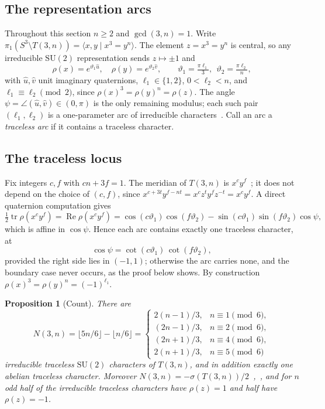 \documentclass[11pt,reqno]{amsart}
\theoremstyle{plain}
\newtheorem{proposition}[theorem]{Proposition}
\theoremstyle{definition}
\newcommand{\SU}{\mathrm{SU}(2)}
\newcommand{\tr}{\operatorname{tr}}
\begin{document}
\subsection{The representation arcs}
Throughout this section $n\ge2$ and $\gcd(3,n)=1$. Write
$\pi_1(S^3\setminus T(3,n))=\langle x,y\mid x^3=y^n\rangle$. The element
$z=x^3=y^n$ is central, so any irreducible $\SU$ representation sends $z\mapsto\pm1$ and
\[
\rho(x)=e^{\vartheta_1\hat u},\quad\rho(y)=e^{\vartheta_2\hat v},\qquad
\vartheta_1=\tfrac{\pi\ell_1}{3},\ \ \vartheta_2=\tfrac{\pi\ell_2}{n},
\]
with $\hat u,\hat v$ unit imaginary quaternions, $\ell_1\in\{1,2\}$, $0<\ell_2<n$, and
$\ell_1\equiv\ell_2\pmod2$, since $\rho(x)^3=\rho(y)^n=\rho(z)$. The angle $\psi=\angle(\hat u,\hat
v)\in(0,\pi)$ is the only remaining modulus; each such pair $(\ell_1,\ell_2)$ is a one-parameter arc of
irreducible characters~\cite[Thm.~1]{Klassen}. Call an arc a \emph{traceless arc} if it contains a
traceless character.

\subsection{The traceless locus}
Fix integers $c,f$ with $cn+3f=1$. The meridian of $T(3,n)$ is $x^cy^f$~\cite[\S5.1]{HHK1}; it does not
depend on the choice of $(c,f)$, since $x^{c+3t}y^{f-nt}=x^cz^ty^fz^{-t}=x^cy^f$. A direct quaternion
computation gives
\[
\tfrac12\tr\rho(x^cy^f)=\operatorname{Re}\rho(x^cy^f)
=\cos(c\vartheta_1)\cos(f\vartheta_2)-\sin(c\vartheta_1)\sin(f\vartheta_2)\cos\psi,
\]
which is affine in $\cos\psi$. Hence each arc contains exactly one traceless character, at
\begin{equation}\label{eq:tf}
\cos\psi=\cot(c\vartheta_1)\,\cot(f\vartheta_2),
\end{equation}
provided the right side lies in $(-1,1)$; otherwise the arc carries none, and the boundary case never
occurs, as the proof below shows. By construction $\rho(x)^3=\rho(y)^n=(-1)^{\ell_1}$.

\begin{proposition}[Count]\label{prop:count}
There are
\[
N(3,n)=\lfloor 5n/6\rfloor-\lfloor n/6\rfloor=\begin{cases}
2(n-1)/3,& n\equiv1\pmod 6,\\ (2n-1)/3,& n\equiv2\pmod 6,\\
(2n+1)/3,& n\equiv4\pmod 6,\\ 2(n+1)/3,& n\equiv5\pmod 6
\end{cases}
\]
irreducible traceless $\SU$ characters of $T(3,n)$, and in addition exactly one abelian traceless
character. Moreover $N(3,n)=-\sigma(T(3,n))/2$~\cite[\S5.1]{HHK1},~\cite[\S9.5]{DSEquiv}, and for $n$ odd
half of the irreducible traceless characters have $\rho(z)=1$ and half have $\rho(z)=-1$.
\end{proposition}
\end{document}
